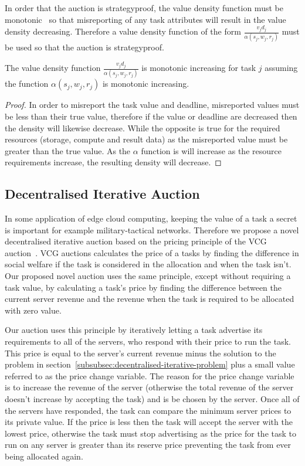 In order that the auction is strategyproof, the value density function must be
monotonic~\cite{nisan2007algorithmic_229_230} so that misreporting of any task attributes will result in the value
density decreasing. Therefore a value density function of the form $\frac{v_j d_j}{\alpha(s_j, w_j, r_j)}$ must be used so
that the auction is strategyproof.
\begin{theorem}
    The value density function $\frac{v_j d_j}{\alpha(s_j, w_j, r_j)}$ is monotonic increasing for task $j$ assuming the
    function $\alpha(s_j, w_j, r_j)$ is monotonic increasing.
\end{theorem}
\begin{proof}
    In order to misreport the task value and deadline, misreported values must be less than their true value, therefore
    if the value or deadline are decreased then the density will likewise decrease.
    While the opposite is true for the required resources (storage, compute and result data) as the misreported value
    must be greater than the true value. As the $\alpha$ function is will increase as the resource requirements increase,
    the resulting density will decrease.
\end{proof}

\subsection{Decentralised Iterative Auction}\label{subsec:decentralised-iterative-auction}
In some application of edge cloud computing, keeping the value of a task a secret is important for example
military-tactical networks. Therefore we propose a novel decentralised iterative auction based on the pricing principle
of the VCG auction~\cite{vickrey,Clarke,groves}. VCG auctions calculates the price of a tasks by finding the
difference in social welfare if the task is considered in the allocation and when the task isn't. Our proposed novel
auction uses the same principle, except without requiring a task value, by calculating a task's price by finding the
difference between the current server revenue and the revenue when the task is required to be allocated with zero value.

Our auction uses this principle by iteratively letting a task advertise its requirements to all of the servers, who
respond with their price to run the task. This price is equal to the server's current revenue minus the solution to the
problem in section~\ref{subsubsec:decentralised-iterative-problem} plus a small value referred to as the price change
variable. The reason for the price change variable is to increase the revenue of the server (otherwise the total
revenue of the server doesn't increase by accepting the task) and is be chosen by the server. Once all of the servers
have responded, the task can compare the minimum server prices to its private value. If the price is less then the
task will accept the server with the lowest price, otherwise the task must stop advertising as the price for the task
to run on any server is greater than its reserve price preventing the task from ever being allocated again.

